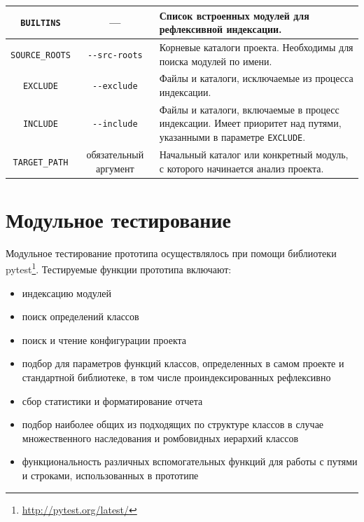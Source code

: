 \begin{center}
\begin{scriptsize}
\begin{longtable}{|c|c|p{4cm}|}
  \texttt{BUILTINS} & --- & Список встроенных модулей для рефлексивной
  индексации.
  \\ \hline

  \texttt{SOURCE\_ROOTS} & \texttt{-{}-src-roots} & Корневые каталоги проекта.
  Необходимы для поиска модулей по имени.  
  \\ \hline

  \texttt{EXCLUDE} & \texttt{-{}-exclude} & Файлы и каталоги, исключаемые из
  процесса индексации.
  \\ \hline

  \texttt{INCLUDE} & \texttt{-{}-include} & Файлы и каталоги, включаемые в
  процесс индексации. Имеет приоритет над путями, указанными в параметре
  \texttt{EXCLUDE}.
  \\ \hline

  \texttt{TARGET\_PATH} & обязательный аргумент & Начальный каталог или
  конкретный модуль, с которого начинается анализ проекта.
  \\ \hline

\end{longtable}
\end{scriptsize}
\end{center}

\newpage

\section{Модульное тестирование}
\label{sec:unit-testing}

Модульное тестирование прототипа осуществлялось при помощи библиотеки
pytest\footnote{\url{http://pytest.org/latest/}}. Тестируемые функции прототипа
включают:

\begin{itemize}
    \item индексацию модулей
    \item поиск определений классов
    \item поиск и чтение конфигурации проекта
    \item подбор для параметров функций классов, определенных в самом проекте и
      стандартной библиотеке, в том числе проиндексированных рефлексивно
    \item сбор статистики и форматирование отчета
    \item подбор наиболее общих из подходящих по структуре классов в случае
      множественного наследования и ромбовидных иерархий классов
    \item функциональность различных вспомогательных функций для работы с
      путями и строками, использованных в прототипе
\end{itemize}

